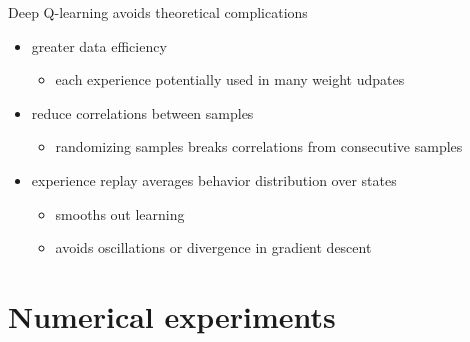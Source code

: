 \begin{frame}{Deep Q-learning}
    avoids theoretical complications
    \vspace*{0.5em}
    \begin{itemize}\itemsep=12pt

        \item greater data efficiency
        \vspace*{0.5em}
        \begin{itemize}
            \item each experience potentially used in many weight udpates
        \end{itemize}

        \item reduce correlations between samples
        \vspace*{0.5em}
        \begin{itemize}
            \item randomizing samples breaks correlations from consecutive samples
        \end{itemize}

        \item experience replay averages behavior distribution over states
        \vspace*{0.5em}
        \begin{itemize}
            \item smooths out learning
            \item avoids oscillations or divergence in gradient descent
        \end{itemize}

    \end{itemize}
\end{frame}

\section{Numerical experiments}

